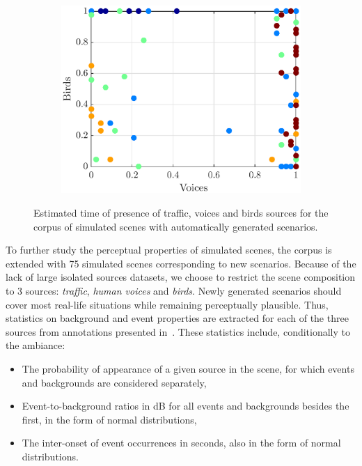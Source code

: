 \documentclass[11pt,a4paper]{article}
\begin{document}
\begin{figure}[h]
\begin{subfigure}[t]{0.33\textwidth}
        \includegraphics[width=\textwidth]{figures/vb_pres.eps}
    \end{subfigure}
    \caption{Estimated time of presence of traffic, voices and birds sources for the corpus of simulated scenes with automatically generated scenarios.}\label{fig:tvb_pres}
\end{figure}

To further study the perceptual properties of simulated scenes, the corpus is extended with 75 simulated scenes corresponding to new scenarios. Because of the lack of large isolated sources datasets, we choose to restrict the scene composition to 3 sources: \textit{traffic}, \textit{human voices} and \textit{birds}. Newly generated scenarios should cover most real-life situations while remaining perceptually plausible. Thus, statistics on background and event properties are extracted for each of the three sources from annotations presented in~\cite{gloaguen2017}. These statistics include, conditionally to the ambiance:

\begin{itemize}
\item The probability of appearance of a given source in the scene, for which events and backgrounds are considered separately,
\item Event-to-background ratios in dB for all events and backgrounds besides the first, in the form of normal distributions,
\item The inter-onset of event occurrences in seconds, also in the form of normal distributions.
\end{itemize}
\end{document}
